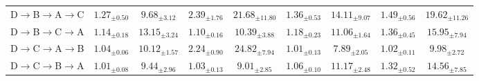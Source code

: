 \begin{table}[!t]
\begin{tabular*}{\textwidth}{@{\extracolsep{\fill}}lcccccccc}
D$\to$B$\to$A$\to$C & $1.27_{\pm0.50}$ & $9.68_{\pm3.12}$ & $2.39_{\pm1.76}$ & $21.68_{\pm11.80}$ & $1.36_{\pm0.53}$ & $14.11_{\pm9.07}$ & $1.49_{\pm0.56}$ & $19.62_{\pm11.26}$ \\
D$\to$B$\to$C$\to$A & $1.14_{\pm0.18}$ & $13.15_{\pm3.24}$ & $1.10_{\pm0.16}$ & $10.39_{\pm3.88}$ & $1.18_{\pm0.23}$ & $11.06_{\pm1.64}$ & $1.36_{\pm0.45}$ & $15.95_{\pm7.94}$ \\
D$\to$C$\to$A$\to$B & $1.04_{\pm0.06}$ & $10.12_{\pm1.57}$ & $2.24_{\pm0.90}$ & $24.82_{\pm7.94}$ & $1.01_{\pm0.13}$ & $7.89_{\pm2.05}$ & $1.02_{\pm0.11}$ & $9.98_{\pm2.72}$ \\
D$\to$C$\to$B$\to$A & $1.01_{\pm0.08}$ & $9.44_{\pm2.96}$ & $1.03_{\pm0.13}$ & $9.01_{\pm2.85}$ & $1.06_{\pm0.10}$ & $11.17_{\pm2.48}$ & $1.32_{\pm0.52}$ & $14.56_{\pm7.85}$ \\
\bottomrule
\end{tabular*}
\end{table}
